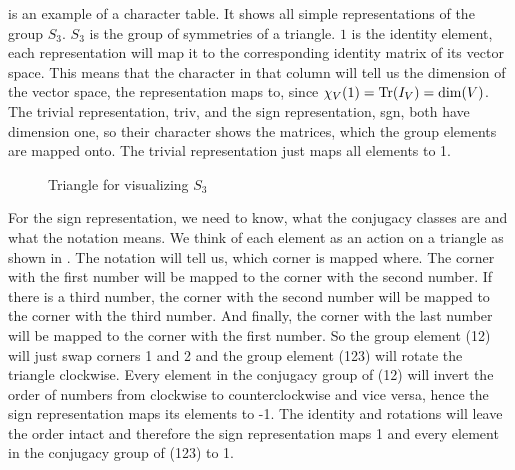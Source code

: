  is an example of a character table.
It shows all simple representations of the group $S_3$.
$S_3$ is the group of symmetries of a triangle.
$1$ is the identity element, each representation will map it to the corresponding identity matrix of its vector space.
This means that the character in that column will tell us the dimension of the vector space, the representation maps to, since $\chi_V(1) = \operatorname{Tr}(I_V) = \dim(V)$.
The trivial representation, triv, and the sign representation, sgn, both have dimension one, so their character shows the matrices, which the group elements are mapped onto.
The trivial representation just maps all elements to 1.

\begin{figure}[!h]
    \centering
    

    \caption{Triangle for visualizing $S_3$}
    \label{fig:reprep.char.triangle}
\end{figure}

For the sign representation, we need to know, what the conjugacy classes are and what the notation means.
We think of each element as an action on a triangle as shown in .
The notation will tell us, which corner is mapped where.
The corner with the first number will be mapped to the corner with the second number.
If there is a third number, the corner with the second number will be mapped to the corner with the third number.
And finally, the corner with the last number will be mapped to the corner with the first number.
So the group element (12) will just swap corners 1 and 2 and the group element (123) will rotate the triangle clockwise.
Every element in the conjugacy group of (12) will invert the order of numbers from clockwise to counterclockwise and vice versa, hence the sign representation maps its elements to -1.
The identity and rotations will leave the order intact and therefore the sign representation maps 1 and every element in the conjugacy group of (123) to 1.

